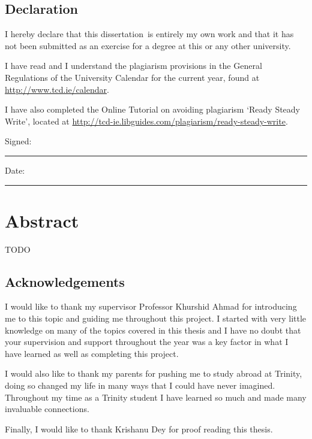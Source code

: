 \documentclass[a4paper,oneside,12pt]{book}
\title{\thesistitle}
\author{\authorname}
\newcommand{\typeofthesis}{dissertation} %
\begin{document}

\section*{\Huge{Declaration}}
\vspace{1cm}
I hereby declare that this \typeofthesis\ is entirely my own work and that it has not been submitted as an exercise for a degree at this or any other university.

\vspace{1cm}
I have read and I understand the plagiarism provisions in the General Regulations of the University Calendar for the current year, found at \url{http://www.tcd.ie/calendar}.
\vspace{1cm}

I have also completed the Online Tutorial on avoiding plagiarism `Ready Steady Write', located at \url{http://tcd-ie.libguides.com/plagiarism/ready-steady-write}.
\vspace{3cm}

Signed:~\rule{5cm}{0.3pt}\hfill Date:~\rule{5cm}{0.3pt}

\chapter*{Abstract}

TODO %

\newpage
\onehalfspacing\raggedright %

\section*{\Huge{Acknowledgements}}

I would like to thank my supervisor Professor Khurshid Ahmad for introducing me to this topic and guiding me throughout this project. I started with very little knowledge on many of the topics covered in this thesis and I have no doubt that your supervision and support throughout the year was a key factor in what I have learned as well as completing this project.

I would also like to thank my parents for pushing me to study abroad at Trinity, doing so changed my life in many ways that I could have never imagined. Throughout my time as a Trinity student I have learned so much and made many invaluable connections.

Finally, I would like to thank Krishanu Dey for proof reading this thesis.

\tableofcontents

\mainmatter
\listoffigures
\listoftables







\end{document}

